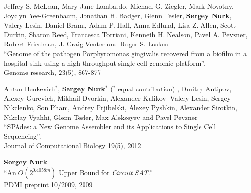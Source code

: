 \begin{innerlist}
\blankline

\item Jeffrey S. McLean, Mary-Jane Lombardo, Michael G. Ziegler, Mark Novotny, Joyclyn Yee-Greenbaum, Jonathan H. Badger, Glenn Tesler, \textbf{Sergey Nurk}, Valery Lesin, Daniel Brami, Adam P. Hall, Anna Edlund, Lisa Z. Allen, Scott Durkin, Sharon Reed, Francesca Torriani, Kenneth H. Nealson, Pavel A. Pevzner, Robert Friedman, J. Craig Venter and Roger S. Lasken \\
``Genome of the pathogen Porphyromonas gingivalis recovered from a biofilm in a hospital sink using a high-throughput single cell genomic platform''. \\
Genome research, 23(5), 867-877

\blankline

\item Anton Bankevich$^*$, \textbf{Sergey Nurk}$^*$ ($^*$ equal contribution)%
, Dmitry Antipov, Alexey Gurevich, Mikhail Dvorkin, Alexander Kulikov, Valery Lesin, Sergey Nikolenko, Son Pham, Andrey Prjibelski, Alexey Pyshkin, Alexander Sirotkin, Nikolay Vyahhi, Glenn Tesler, Max Alekseyev and Pavel Pevzner \\
``SPAdes: a New Genome Assembler and its Applications to Single Cell Sequencing''.\\
Journal of Computational Biology 19(5), 2012

\blankline

\item \textbf{Sergey Nurk} \\
``An $O(2^{0.4058m})$ Upper Bound for \textit{Circuit SAT}.''\\
PDMI preprint 10/2009, 2009
\end{innerlist}

